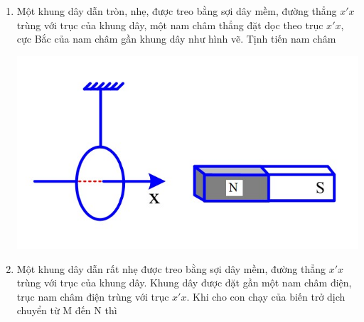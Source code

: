 \begin{enumerate}
{\begin{center}
		\end{center}
	}
	\item
	{
		Một khung dây dẫn tròn, nhẹ, được treo bằng sợi dây mềm, đường thẳng $x'x$ trùng với trục của khung dây, một nam châm thẳng đặt dọc theo trục $x'x$, cực Bắc của nam châm gần khung dây như hình vẽ. Tịnh tiến nam châm
		\begin{center}
			\includegraphics[scale=0.4]{../figs/VN11-PH-29-P-0191-5}
		\end{center}
	}
	\item
	{
		Một khung dây dẫn rất nhẹ được treo bằng sợi dây mềm, đường thẳng $x'x$ trùng với trục của khung dây. Khung dây được đặt gần một nam châm điện, trục nam châm điện trùng với trục $x'x$. Khi cho con chạy của biến trở dịch chuyển từ M đến N thì
		\begin{center}

\end{center}}
\end{enumerate}
